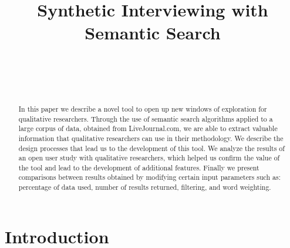 \documentclass{sigchi}
\def\plaintitle{Synthetic Interviewing with Semantic Search}
\begin{document}
\title{\plaintitle}

\author{%
  \\
  \\
  \\
}

\maketitle

\begin{abstract}
  In this paper we describe a novel tool to open up new windows of exploration for qualitative researchers. Through the use of semantic search algorithms applied to a large corpus of data, obtained from LiveJournal.com, we are able to extract valuable information that qualitative researchers can use in their methodology. We describe the design processes that lead us to the development of this tool. We analyze the results of an open user study with qualitative researchers, which helped us confirm the value of the tool and lead to the development of additional features. Finally we present comparisons between results obtained by modifying certain input parameters such as: percentage of data used, number of results returned, filtering, and word weighting.
\end{abstract}



\section{Introduction}
\end{document}
